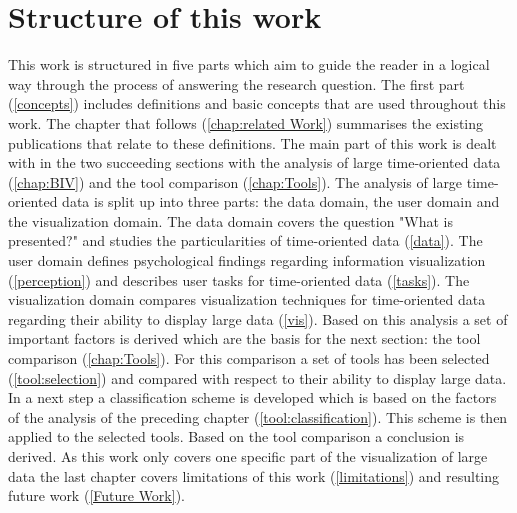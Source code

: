 \section{Structure of this work}
This work is structured in five parts which aim to guide the reader in a logical way through the process of answering the research question. The first part (\ref{concepts}) includes definitions and basic concepts that are used throughout this work.  The chapter that follows (\ref{chap:related Work}) summarises the existing publications that relate to these definitions. The main part of this work is dealt with in the two succeeding sections with the analysis of large time-oriented data (\ref{chap:BIV}) and the tool comparison (\ref{chap:Tools}). The analysis of large time-oriented data is split up into three parts: the data domain,  the user domain and the visualization domain. The data domain covers the question "What is presented?" and studies the particularities of time-oriented data (\ref{data}). The user domain defines psychological findings regarding information visualization  (\ref{perception}) and describes user tasks for time-oriented data (\ref{tasks}). The visualization domain compares visualization techniques for time-oriented data regarding their ability to display large data (\ref{vis}). Based on this analysis a set of important factors is derived which are the basis for the next section: the tool comparison (\ref{chap:Tools}). For this comparison a set of tools has been selected (\ref{tool:selection}) and compared with respect to their ability to display large data. In a next step a classification scheme is developed which is based on the factors of the analysis of the preceding chapter (\ref{tool:classification}). This scheme is then applied to the selected tools.
Based on the tool comparison a conclusion is derived.
As this work only covers one specific part of the visualization of large data the last chapter covers limitations of this work (\ref{limitations}) and resulting future work (\ref{Future Work}).